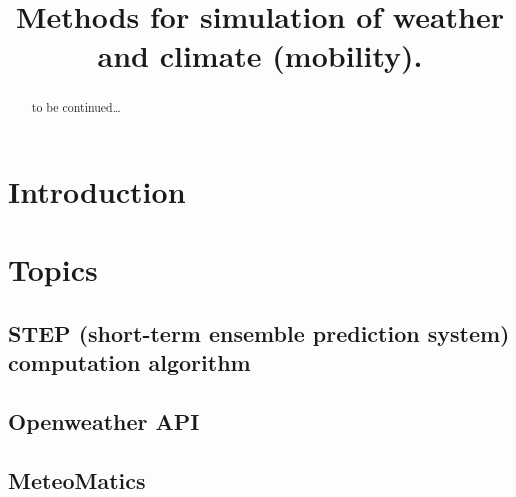 \documentclass[conference]{IEEEtran}
\begin{document}
\title{Methods for simulation of weather and climate
(mobility).\\}

\author{
\and
{}
}

\maketitle

\begin{abstract}
to be continued\ldots
\end{abstract}

\section{Introduction}\label{sec:introduction}


\section{Topics}\label{sec:topics}

\subsection{STEP (short-term ensemble prediction system) computation algorithm}\label{subsec:step-(short-term-ensemble-prediction-system)-computation-algorithm}


\subsection{Openweather API}\label{subsec:openweather-api}


\subsection{MeteoMatics}\label{subsec:meteomatics}

\end{document}
